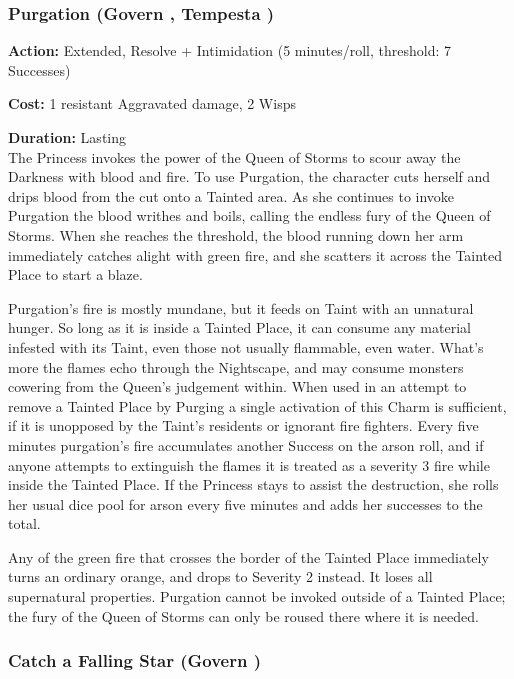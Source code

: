 \subsubsection*{Purgation (Govern \textbullet\textbullet\textbullet, Tempesta \textbullet\textbullet\textbullet\textbullet)}

\noindent \textbf{Action:} Extended, Resolve + Intimidation (5 minutes/roll, threshold: 7 Successes)

\noindent \textbf{Cost:} 1 resistant Aggravated damage, 2 Wisps

\noindent \textbf{Duration:} Lasting \\

\noindent The Princess invokes the power of the Queen of Storms to scour away the Darkness with blood and fire. To use Purgation, the character cuts herself and drips blood from the cut onto a Tainted area. As she continues to invoke Purgation the blood writhes and boils, calling the endless fury of the Queen of Storms. When she reaches the threshold, the blood running down her arm immediately catches alight with green fire, and she scatters it across the Tainted Place to start a blaze.

Purgation’s fire is mostly mundane, but it feeds on Taint with an unnatural hunger. So long as it is inside a Tainted Place, it can consume any material infested with its Taint, even those not usually flammable, even water. What's more the flames echo through the Nightscape, and may consume monsters cowering from the Queen's judgement within. When used in an attempt to remove a Tainted Place by Purging a single activation of this Charm is sufficient, if it is unopposed by the Taint's residents or ignorant fire fighters. Every five minutes purgation's fire accumulates another Success on the arson roll, and if anyone attempts to extinguish the flames it is treated as a severity 3 fire while inside the Tainted Place. If the Princess stays to assist the destruction, she rolls her usual dice pool for arson every five minutes and adds her successes to the total. 

Any of the green fire that crosses the border of the Tainted Place immediately turns an ordinary orange, and drops to Severity 2 instead. It loses all supernatural properties. Purgation cannot be invoked outside of a Tainted Place; the fury of the Queen of Storms can only be roused there where it is needed.



\subsubsection*{Catch a Falling Star (Govern \textbullet\textbullet\textbullet)}
	\bigsidebarstart

